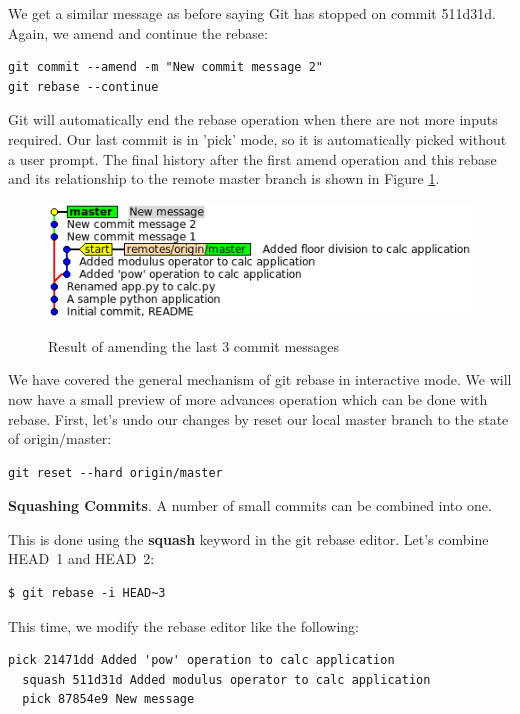\documentclass{../../common/tufte-latex/tufte-handout}
\begin{document}
We get a similar message as before saying Git has stopped on commit 511d31d.
Again, we amend and continue the rebase:

\begin{lstlisting}[style=BashInputStyle]
git commit --amend -m "New commit message 2"
git rebase --continue
\end{lstlisting}

Git will automatically end the rebase operation when there are not more inputs required.
Our last commit is in 'pick' mode, so it is automatically picked without a user prompt.
The final history after the first amend operation and this rebase and its relationship to the remote master branch is shown in Figure \ref{fig:gitrebase-amend}.

\begin{figure}%
  \centering
  \includegraphics[width=0.75\linewidth]{gitrebase-amend.png}
  \label{fig:gitrebase-amend}
  \caption{Result of amending the last 3 commit messages}
\end{figure}

\noindent We have covered the general mechanism of git rebase in interactive mode. 
We will now have a small preview of more advances operation which can be done with rebase.
First, let's undo our changes by reset our local master branch to the state of origin/master:

\begin{lstlisting}[style=BashInputStyle]
  git reset --hard origin/master
\end{lstlisting}

\noindent \textbf{Squashing Commits}.
A number of small commits can be combined into one.

This is done using the \textbf{squash} keyword in the git rebase editor.
Let's combine HEAD~1 and HEAD~2:

\begin{lstlisting}[style=BashInputStyle]
  $ git rebase -i HEAD~3
\end{lstlisting}

This time, we modify the rebase editor like the following:
\begin{lstlisting}[style=BashInputStyle]
  pick 21471dd Added 'pow' operation to calc application
  squash 511d31d Added modulus operator to calc application
  pick 87854e9 New message
\end{lstlisting}
\end{document}
